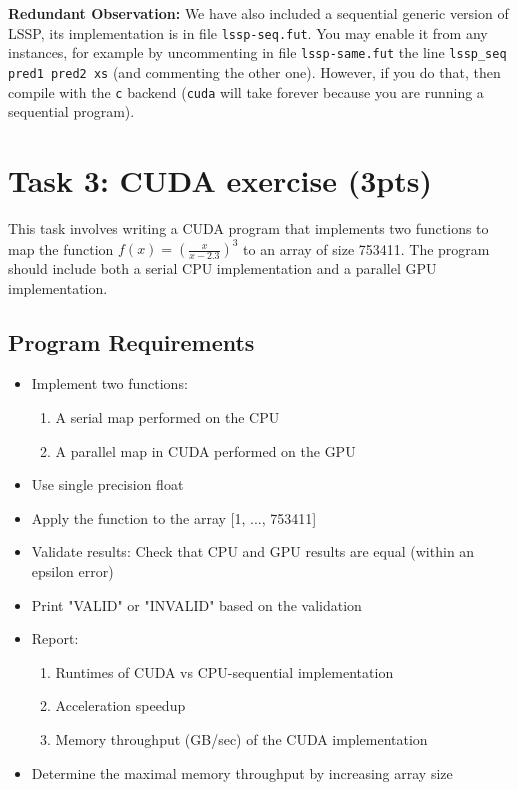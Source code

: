 \documentclass{article}
\begin{document}
\textbf{Redundant Observation:} We have also included a sequential generic version of LSSP, its implementation is in file \texttt{lssp-seq.fut}. You may enable it from any instances, for example by uncommenting in file \texttt{lssp-same.fut} the line \texttt{lssp\_seq pred1 pred2 xs} (and commenting the other one). However, if you do that, then compile with the \texttt{c} backend (\texttt{cuda} will take forever because you are running a sequential program). 
\section{Task 3: CUDA exercise (3pts)}

This task involves writing a CUDA program that implements two functions to map the function $f(x) = (\frac{x}{x-2.3})^3$ to an array of size 753411. The program should include both a serial CPU implementation and a parallel GPU implementation.

\subsection{Program Requirements}

\begin{itemize}
    \item Implement two functions:
    \begin{enumerate}
        \item A serial map performed on the CPU
        \item A parallel map in CUDA performed on the GPU
    \end{enumerate}
    \item Use single precision float
    \item Apply the function to the array [1, ..., 753411]
    \item Validate results: Check that CPU and GPU results are equal (within an epsilon error)
    \item Print "VALID" or "INVALID" based on the validation
    \item Report:
    \begin{enumerate}
        \item Runtimes of CUDA vs CPU-sequential implementation
        \item Acceleration speedup
        \item Memory throughput (GB/sec) of the CUDA implementation
    \end{enumerate}
    \item Determine the maximal memory throughput by increasing array size
\end{itemize}
\end{document}
